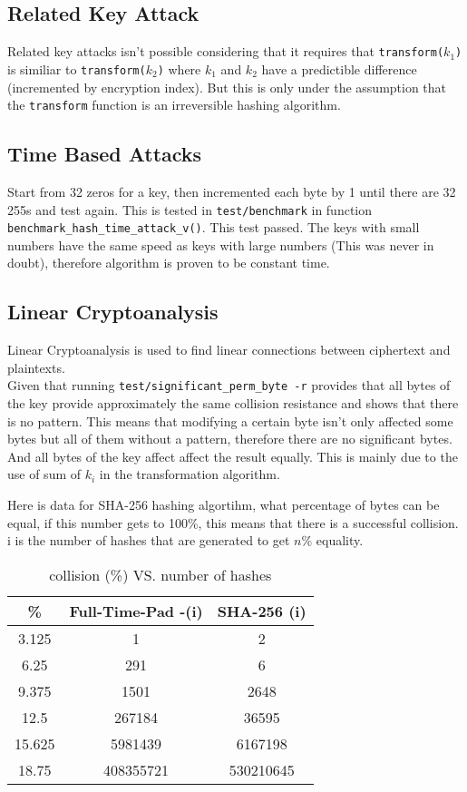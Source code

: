 \documentclass[fleqn, a4paper,12pt]{article}
\begin{document}
\subsection{Related Key Attack}

Related key attacks isn't possible considering that it requires that \texttt{transform($k_1$)} is similiar to \texttt{transform($k_2$)} where $k_1$ and $k_2$ have a predictible difference (incremented by encryption index). But this is only under the assumption that the \texttt{transform} function is an irreversible hashing algorithm.

\subsection{Time Based Attacks}

Start from 32 zeros for a key, then incremented each byte by 1 until there are 32 255s and test again. This is tested in \texttt{test/benchmark} in function \texttt{benchmark\_hash\_time\_attack\_v()}. This test passed. The keys with small numbers have the same speed as keys with large numbers (This was never in doubt), therefore algorithm is proven to be constant time.

\subsection{Linear Cryptoanalysis}

Linear Cryptoanalysis is used to find linear connections between ciphertext and plaintexts.
\\
Given that running \texttt{test/significant\_perm\_byte -r} provides that all bytes of the key provide approximately the same collision resistance and shows that there is no pattern. This means that modifying a certain byte isn't only affected some bytes but all of them without a pattern, therefore there are no significant bytes. And all bytes of the key affect affect the result equally. This is mainly due to the use of sum of $k_i$ in the transformation algorithm. 

Here is data for SHA-256 hashing algortihm, what percentage of bytes can be equal, if this number gets to 100\%, this means that there is a successful collision. i is the number of hashes that are generated to get $n$\% equality.

\begin{table}[h!]
\centering
\begin{tabular}{|c|c|c|}
\hline
\textbf{\%} & \textbf{Full-Time-Pad -(i)} & \textbf{SHA-256 (i)} \\
\hline
		3.125 & 1 & 2 \\
\hline
		6.25 & 291 & 6 \\
\hline
		9.375 & 1501 & 2648 \\
\hline
		12.5 & 267184 & 36595 \\
\hline
		15.625 & 5981439 & 6167198  \\
\hline
		18.75 & 408355721 & 530210645 \\
\hline
\end{tabular}
\caption{collision (\%) VS. number of hashes}
\end{table}
\end{document}
